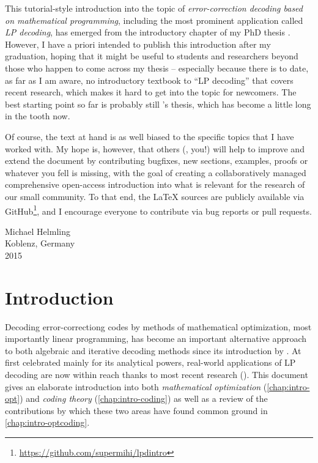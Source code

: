 \documentclass[
  paper=a4,
  parskip=half,
  english,
  fontsize=11pt,
  BCOR=1mm,
  DIV=10,
  twoside=true,
  toc=bib,
  numbers=noendperiod
]{scrbook}
\title{\mytitle}
\subtitle{A tutorial}
\author{\myauthor}
\theoremstyle{change}
\theoremstyle{nonumberplain}
\begin{document}
\maketitle
\tableofcontents

This tutorial-style introduction into the topic of \emph{error-correction decoding based on mathematical programming}, including the most prominent application called \emph{LP decoding}, has emerged from the introductory chapter of my PhD thesis \cite{Helmling15PhD}. However, I have a priori intended to publish this introduction after my graduation, hoping that it might be useful to students and researchers beyond those who happen to come across my thesis – especially because there is to date, as far as I am aware, no introductory textbook to \enquote{LP decoding} that covers recent research, which makes it hard to get into the topic for newcomers. The best starting point so far is probably still \citeauthor{Feldman03PhD}'s thesis, which has become a little long in the tooth now.

Of course, the text at hand is as well biased to the specific topics that I have worked with. My hope is, however, that others (\ie, you!) will help to improve and extend the document by contributing bugfixes, new sections, examples, proofs or whatever you fell is missing, with the goal of creating a collaboratively managed comprehensive open-access introduction into what is relevant for the research of our small community. To that end, the \LaTeX{} sources are publicly available via GitHub\footnote{\url{https://github.com/supermihi/lpdintro}}, and I encourage everyone to contribute via bug reports or pull requests.
\begin{FlushRight}
  Michael Helmling\\
  Koblenz, Germany\\
  2015
\end{FlushRight}

\chapter*{Introduction}
Decoding error-correctiong codes by methods of mathematical optimization, most importantly linear programming, has become an important alternative approach to both algebraic and iterative decoding methods since its introduction by \textcite{Feldman+05LPDecoding}. At first celebrated mainly for its analytical powers, real-world applications of LP decoding are now within reach thanks to most recent research (\cite{Liu+12PenalizedLPD, Gensheimer+14SimplexHard}). This document gives an elaborate introduction into both \emph{mathematical optimization} (\cref{chap:intro-opt}) and \emph{coding theory} (\cref{chap:intro-coding}) as well as a review of the contributions by which these two areas have found common ground in \cref{chap:intro-optcoding}.
\end{document}
